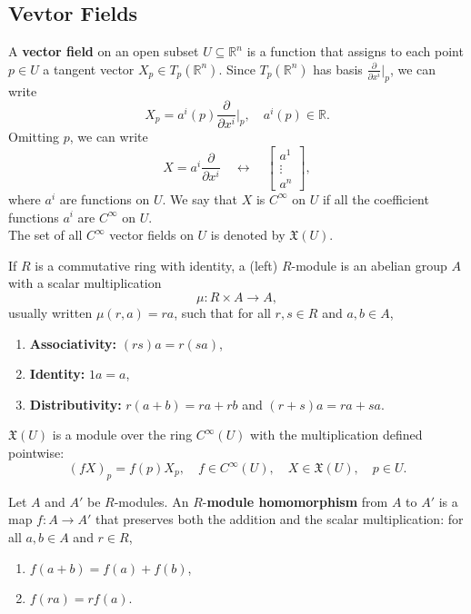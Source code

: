\documentclass[en, oneside]{vivi}
\begin{document}
\subsection{Vevtor Fields}
\begin{dfn}
    A \textbf{vector field} on an open subset $U \subseteq \mathbb{R}^n$ is a function that assigns to each point $p \in U$ a tangent vector $X_p \in T_p(\mathbb{R}^n)$.
    Since $T_p(\mathbb{R}^n)$ has basis $\frac{\partial}{\partial x^i}|_p$, we can write
    \begin{equation*}
        X_p = a^i(p) \frac{\partial}{\partial x^i} \bigg|_p, \quad a^i(p) \in \mathbb{R}.
    \end{equation*}
    Omitting $p$, we can write 
    \begin{equation*}
        X = a^i \frac{\partial}{\partial x^i} \quad \leftrightarrow \quad \begin{bmatrix*}
            a^1 \\
            \vdots \\
            a^n
        \end{bmatrix*},
    \end{equation*}
    where $a^i$ are functions on $U$. 
    We say that $X$ is $C^\infty$ on $U$ if all the coefficient functions $a^i$ are $C^\infty$ on $U$.\\
    The set of all $C^\infty$ vector fields on $U$ is denoted by $\mathfrak{X}(U)$.
\end{dfn}
\begin{dfn}
    If $R$ is a commutative ring with identity, a (left) $R$-module is an abelian group $A$ with a scalar multiplication
    \begin{equation*}
        \mu: R \times A \to A,
    \end{equation*}
    usually written $\mu(r, a) = ra$, such that for all $r, s \in R$ and $a, b \in A$,
    \begin{enumerate}[label=(\roman*)]
        \item \textbf{Associativity:} $(rs)a = r(sa)$,
        \item \textbf{Identity:} $1a = a$,
        \item \textbf{Distributivity:} $r(a + b) = ra + rb$ and $(r + s)a = ra + sa$.
    \end{enumerate}
\end{dfn}
$\mathfrak{X}(U)$ is a module over the ring $C^\infty(U)$ with the multiplication defined pointwise:
\begin{equation*}
    (fX)_p = f(p)X_p, \quad f \in C^\infty(U), \quad X \in \mathfrak{X}(U), \quad p \in U.
\end{equation*}
\begin{dfn}
    Let $A$ and $A'$ be $R$-modules. An $R$-\textbf{module homomorphism} from $A$ to $A'$ is a map $f: A \to A'$ that preserves 
    both the addition and the scalar multiplication: for all $a, b \in A$ and $r \in R$,
    \begin{enumerate}[label=(\roman*)]
        \item $f(a + b) = f(a) + f(b)$,
        \item $f(ra) = rf(a)$.
    \end{enumerate}
\end{dfn}
\end{document}
